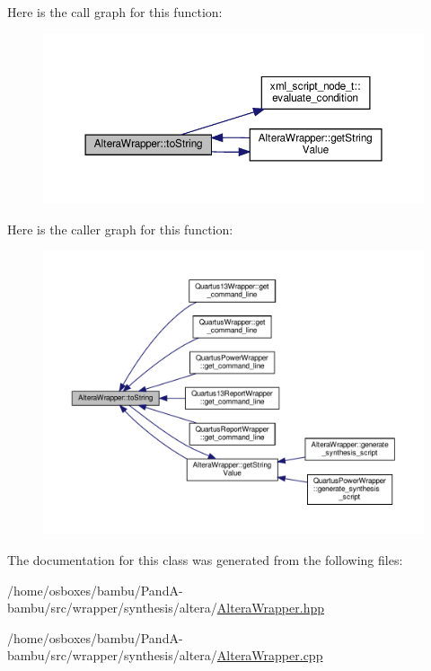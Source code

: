 Here is the call graph for this function\+:
\nopagebreak
\begin{figure}[H]
\begin{center}
\leavevmode
\includegraphics[width=350pt]{d3/d5f/classAlteraWrapper_a0e6e4558b643ccd1ba0179c4e5d470d8_cgraph}
\end{center}
\end{figure}
Here is the caller graph for this function\+:
\nopagebreak
\begin{figure}[H]
\begin{center}
\leavevmode
\includegraphics[width=350pt]{d3/d5f/classAlteraWrapper_a0e6e4558b643ccd1ba0179c4e5d470d8_icgraph}
\end{center}
\end{figure}


The documentation for this class was generated from the following files\+:\begin{DoxyCompactItemize}
\item 
/home/osboxes/bambu/\+Pand\+A-\/bambu/src/wrapper/synthesis/altera/\hyperlink{AlteraWrapper_8hpp}{Altera\+Wrapper.\+hpp}\item 
/home/osboxes/bambu/\+Pand\+A-\/bambu/src/wrapper/synthesis/altera/\hyperlink{AlteraWrapper_8cpp}{Altera\+Wrapper.\+cpp}\end{DoxyCompactItemize}
